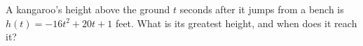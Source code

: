 A kangaroo's height above the ground $t$ seconds after it jumps from a bench is $h(t)=-16t^2+20t+1$ feet. What is its greatest height, and when does it reach it?
